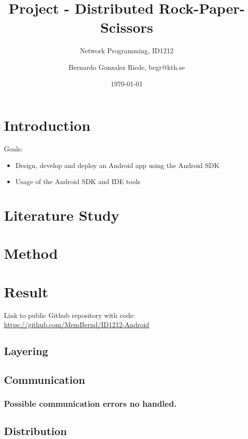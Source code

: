\documentclass[a4paper]{scrartcl}
\title{Project - Distributed Rock-Paper-Scissors}
\subtitle{Network Programming, ID1212}
\author{Bernardo Gonzalez Riede, begr@kth.se}
\date{\today}
\begin{document}
\maketitle

\section{Introduction}
Goals:
\begin{itemize}
	\item Design, develop and deploy an Android app using the Android SDK
	\item Usage of the Android SDK and IDE tools
\end{itemize}


\section{Literature Study}


\section{Method}



\section{Result}

Link to public Github repository with code:
\href{https://github.com/MemBernd/ID1212-Android}{https://github.com/MemBernd/ID1212-Android}

\subsection{Layering}



\subsection{Communication}



\subsubsection{Possible communication errors no handled.}


\subsection{Distribution}
\end{document}
